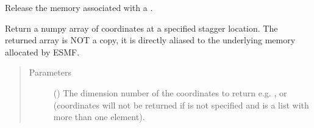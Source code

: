 \documentclass[letterpaper,10pt,english]{sphinxmanual}
\begin{document}
\begin{fulllineitems}
\begin{fulllineitems}
\begin{quote}
\begin{description}
\end{description}\end{quote}

\end{fulllineitems}


\begin{fulllineitems}
\label{\detokenize{grid:ESMF.api.grid.Grid.destroy}}
Release the memory associated with a {\hyperref[\detokenize{grid:ESMF.api.grid.Grid}]{}}.

\end{fulllineitems}


\begin{fulllineitems}
\label{\detokenize{grid:ESMF.api.grid.Grid.get_coords}}
Return a numpy array of coordinates at a specified stagger 
location. The returned array is NOT a copy, it is
directly aliased to the underlying memory allocated by ESMF.

\begin{quote}\begin{description}
\item[{Parameters}] \leavevmode
{} () \textendash{} The dimension number of the coordinates to return
e.g. , or 
(coordinates will not be returned if  is not specified
and  is a list with more than one element).

\end{description}\end{quote}


\end{fulllineitems}
\end{fulllineitems}
\end{document}
